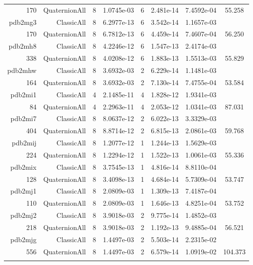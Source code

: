 \begin{xltabular}{\textwidth}{r|rcS[table-format=1.4e+2]cS[table-format=1.3e+2]S[table-format=1.4e+2]S[table-format=-1.3]}
170 & QuaternionAll & 8 & 1.0745e-03 & 6 & 2.481e-14 & 7.4592e-04 & 55.258\\  \addlinespace
pdb2mg3 & ClassicAll & 8 & 6.2977e-13 & 6 & 3.542e-14 & 1.1657e-03 & \\
170 & QuaternionAll & 8 & 6.7812e-13 & 6 & 4.459e-14 & 7.4607e-04 & 56.250\\  \addlinespace
pdb2mh8 & ClassicAll & 8 & 4.2246e-12 & 6 & 1.547e-13 & 2.4174e-03 & \\
338 & QuaternionAll & 8 & 4.0208e-12 & 6 & 1.883e-13 & 1.5513e-03 & 55.829\\  \addlinespace
pdb2mhw & ClassicAll & 8 & 3.6932e-03 & 2 & 6.229e-14 & 1.1481e-03 & \\
164 & QuaternionAll & 8 & 3.6932e-03 & 2 & 7.130e-14 & 7.4755e-04 & 53.584\\  \addlinespace
pdb2mi1 & ClassicAll & 4 & 2.1485e-11 & 4 & 1.828e-12 & 1.9341e-03 & \\
84 & QuaternionAll & 4 & 2.2963e-11 & 4 & 2.053e-12 & 1.0341e-03 & 87.031\\  \addlinespace
pdb2mi7 & ClassicAll & 8 & 8.0637e-12 & 2 & 6.022e-13 & 3.3329e-03 & \\
404 & QuaternionAll & 8 & 8.8714e-12 & 2 & 6.815e-13 & 2.0861e-03 & 59.768\\  \addlinespace
pdb2mij & ClassicAll & 8 & 1.2077e-12 & 1 & 1.244e-13 & 1.5629e-03 & \\
224 & QuaternionAll & 8 & 1.2294e-12 & 1 & 1.522e-13 & 1.0061e-03 & 55.336\\  \addlinespace
pdb2mix & ClassicAll & 8 & 3.7545e-13 & 1 & 4.816e-14 & 8.8110e-04 & \\
128 & QuaternionAll & 8 & 3.4098e-13 & 1 & 4.684e-14 & 5.7309e-04 & 53.747\\  \addlinespace
pdb2mj1 & ClassicAll & 8 & 2.0809e-03 & 1 & 1.309e-13 & 7.4187e-04 & \\
110 & QuaternionAll & 8 & 2.0809e-03 & 1 & 1.646e-13 & 4.8251e-04 & 53.752\\  \addlinespace
pdb2mj2 & ClassicAll & 8 & 3.9018e-03 & 2 & 9.775e-14 & 1.4852e-03 & \\
218 & QuaternionAll & 8 & 3.9018e-03 & 2 & 1.192e-13 & 9.4885e-04 & 56.521\\  \addlinespace
pdb2mjg & ClassicAll & 8 & 1.4497e-03 & 2 & 5.503e-14 & 2.2315e-02 & \\
556 & QuaternionAll & 8 & 1.4497e-03 & 2 & 6.579e-14 & 1.0919e-02 & 104.373\\  \addlinespace

\end{xltabular}
